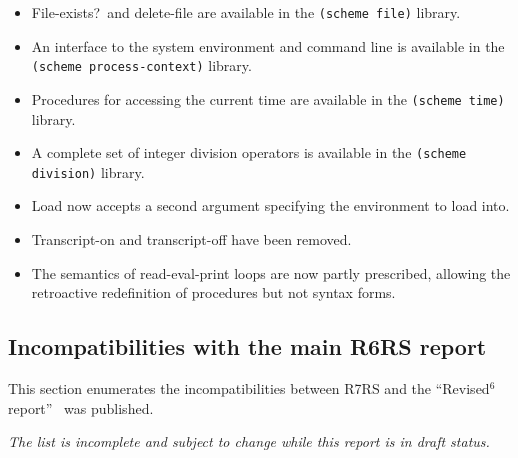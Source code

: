 \begin{itemize}
\item {\cf File-exists?}\ and {\cf delete-file} are available in the
{\tt (scheme file)} library.

\item An interface to the system environment and command line is
available in the {\tt (scheme process-context)} library.

\item Procedures for accessing the current time are available in the
{\tt (scheme time)} library.

\item A complete set of integer division operators is available in the
{\tt (scheme division)} library.

\item {\cf Load} now accepts a second argument specifying the environment to
load into.

\item {\cf Transcript-on} and {\cf transcript-off} have been removed.

\item The semantics of read-eval-print loops are now partly prescribed,
allowing the retroactive redefinition of procedures but not syntax forms.

\end{itemize}

\subsection*{Incompatibilities with the main R6RS report}
This section enumerates the incompatibilities between R7RS and
the ``Revised$^6$ report''~\cite{R6RS} was published.

{\em The list is incomplete and subject to change while this report is in draft status.}

